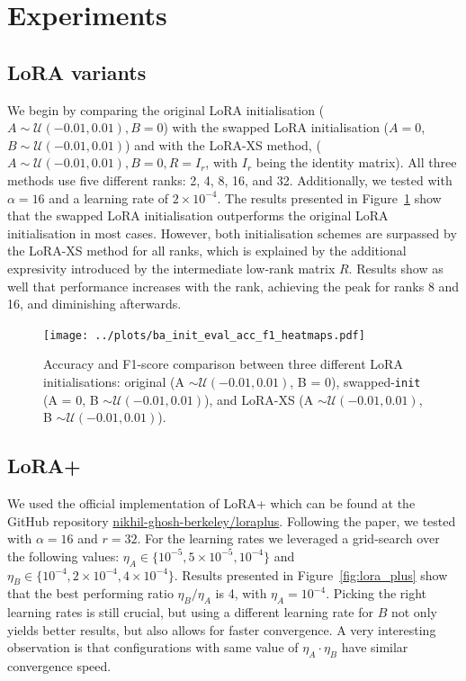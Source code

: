 \documentclass[a4paper,10pt,twocolumn,english]{article}
\begin{document}
\section{Experiments}

\subsection{LoRA variants}

We begin by comparing the original LoRA initialisation ($A \sim \mathcal{U}(-0.01, 0.01), B = 0$) with the swapped LoRA initialisation ($A = 0$, $B \sim \mathcal{U}(-0.01, 0.01)$) and with the LoRA-XS method, ($A \sim \mathcal{U}(-0.01, 0.01), B = 0, R = I_r$, with $I_r$ being the identity matrix). All three methods use five different ranks: 2, 4, 8, 16, and 32. Additionally, we tested with $\alpha = 16$ and a learning rate of $2 \times 10 ^ {-4}$. The results presented in Figure~\ref{fig:ba_init} show that the swapped LoRA initialisation outperforms the original LoRA initialisation in most cases. However, both initialisation schemes are surpassed by the LoRA-XS method for all ranks, which is explained by the additional expresivity introduced by the intermediate low-rank matrix $R$. Results show as well that performance increases with the rank, achieving the peak for ranks 8 and 16, and diminishing afterwards.

\begin{figure}[ht]
    \centering
    \texttt{[image: ../plots/ba\_init\_eval\_acc\_f1\_heatmaps.pdf]}
    \caption{Accuracy and F1-score comparison between three different LoRA initialisations: original (A $\sim \mathcal{U}(-0.01, 0.01)$, B = 0), swapped-\texttt{init} (A = 0, B $\sim \mathcal{U}(-0.01, 0.01)$), and LoRA-XS (A $\sim \mathcal{U}(-0.01, 0.01)$, B $\sim \mathcal{U}(-0.01, 0.01)$).}
    \label{fig:ba_init}
\end{figure}



\subsection{LoRA+}

We used the official implementation of LoRA+ which can be found at the GitHub repository \href{https://github.com/nikhil-ghosh-berkeley/loraplus}{nikhil-ghosh-berkeley/loraplus}. Following the paper, we tested with $\alpha = 16$ and $r = 32$. For the learning rates we leveraged a grid-search over the following values: $\eta_A \in \{10^{-5}, 5 \times 10^{-5}, 10^{-4}\}$ and $\eta_B \in \{10^{-4}, 2 \times 10^{-4}, 4 \times 10^{-4}\}$. Results presented in Figure~\ref{fig:lora_plus} show that the best performing ratio $\eta_B / \eta_A$ is 4, with $\eta_A = 10^{-4}$. Picking the right learning rates is still crucial, but using a different learning rate for $B$ not only yields better results, but also allows for faster convergence. A very interesting observation is that configurations with same value of $\eta_A \cdot \eta_B$ have similar convergence speed.
\end{document}
